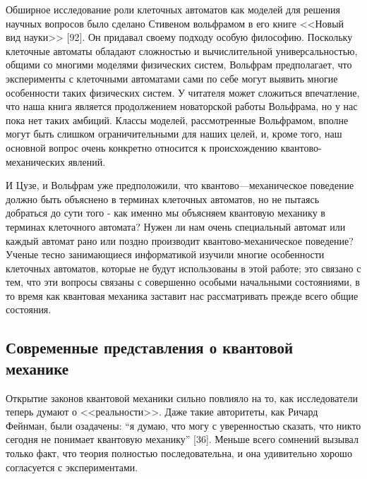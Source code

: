 \documentclass[main.tex]{subfiles}
\begin{document}
Обширное исследование роли клеточных автоматов как моделей для решения научных вопросов было сделано Стивеном вольфрамом в его книге <<Новый вид науки>> [92]. Он придавал своему подходу особую философию. Поскольку клеточные автоматы обладают сложностью и вычислительной универсальностью, общими со многими моделями физических систем, Вольфрам предполагает, что эксперименты с клеточными автоматами сами по себе могут выявить многие особенности таких физических систем. У читателя может сложиться впечатление, что наша книга является продолжением новаторской работы Вольфрама, но у нас пока нет таких амбиций. Классы моделей, рассмотренные Вольфрамом, вполне могут быть слишком ограничительными для наших целей, и, кроме того, наш основной вопрос очень конкретно относится к происхождению квантово-механических явлений. 

И Цузе, и Вольфрам уже предположили, что квантово—механическое поведение должно быть объяснено в терминах клеточных автоматов, но не пытаясь добраться до сути того - как именно мы объясняем квантовую механику в терминах клеточного автомата? Нужен ли нам очень специальный автомат или каждый автомат рано или поздно производит квантово-механическое поведение? Ученые тесно занимающиеся информатикой изучили многие особенности клеточных автоматов, которые не будут использованы в этой работе; это связано с тем, что эти вопросы связаны с совершенно особыми начальными состояниями, в то время как квантовая механика заставит нас рассматривать прежде всего общие состояния.

\subsection{Современные представления о квантовой механике}\label{ch1.5}

Открытие законов квантовой механики сильно повлияло на то, как исследователи теперь думают о <<реальности>>. Даже такие авторитеты, как Ричард Фейнман, были озадачены: ``я думаю, что могу с уверенностью сказать, что никто сегодня не понимает квантовую механику'' [36]. Меньше всего сомнений вызывал только факт, что теория полностью последовательна, и она удивительно хорошо согласуется с экспериментами. 
\end{document}
